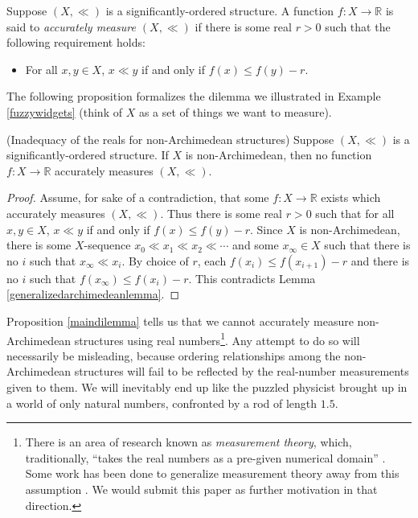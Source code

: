 \documentclass[twoside,11pt]{article}
\begin{document}
\begin{definition}
    Suppose $(X,\ll)$ is a significantly-ordered structure.
    A function $f:X\to\mathbb R$ is said to \emph{accurately measure $(X,\ll)$}
    if there is some real $r>0$ such that the following requirement holds:
    \begin{itemize}
        \item
        For all $x,y\in X$, $x\ll y$ if and only if
        $f(x)\leq f(y)-r$.
    \end{itemize}
\end{definition}

The following proposition formalizes the dilemma we illustrated in
Example \ref{fuzzywidgets} (think of $X$ as a set of things we
want to measure).

\begin{proposition}
\label{maindilemma}
(Inadequacy of the reals for non-Archimedean structures)
    Suppose $(X,\ll)$ is a significantly-ordered structure.
    If $X$ is non-Archimedean, then no function $f:X\to\mathbb R$
    accurately measures $(X,\ll)$.
\end{proposition}

\begin{proof}
    Assume, for sake of a contradiction, that some $f:X\to\mathbb R$
    exists which accurately measures $(X,\ll)$. Thus there is some real $r>0$ such that
    for all $x,y\in X$, $x\ll y$ if and only if $f(x)\leq f(y)-r$.
    Since $X$ is non-Archimedean, there is some $X$-sequence
    $x_0\ll x_1\ll x_2\ll\cdots$ and some $x_\infty\in X$
    such that there is no $i$ such that $x_\infty\ll x_i$.
    By choice of $r$, each $f(x_{i})\leq f(x_{i+1})-r$ and there is no
    $i$ such that $f(x_\infty)\leq f(x_i)-r$.
    This contradicts Lemma \ref{generalizedarchimedeanlemma}.
\end{proof}

Proposition \ref{maindilemma} tells us that we cannot accurately measure
non-Archimedean structures using real numbers\footnote{There is an area of research
known as \emph{measurement theory}, which, traditionally,
``takes the real numbers as a pre-given numerical domain'' \citep{niederee1992numbers}.
Some work has been done to generalize measurement theory away from this assumption
\citep{narens1974, skala1975, rizza2016divergent}.
We would submit this paper as further motivation in that direction.}.
Any attempt to do so will necessarily be misleading, because ordering
relationships among the non-Archimedean structures will fail to be reflected
by the real-number measurements given to them.
We will inevitably end up like the puzzled physicist
brought up in a world of only natural numbers, confronted by a rod of
length $1.5$.
\end{document}
